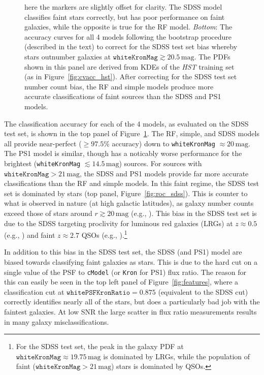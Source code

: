\documentclass[twocolumn]{aastex62}
\begin{document}
\begin{figure}[htb]
{  here the markers are slightly offset for clarity. The SDSS model
  classifies faint stars correctly, but has poor performance on faint
  galaxies, while the opposite is true for the RF model.
  \textit{Bottom}: The accuracy curves for all 4 models following the
  bootstrap procedure (described in the text) to correct for the SDSS test
  set bias whereby stars outnumber galaxies at $\mathtt{whiteKronMag}
  \gtrsim 20.5\,\mathrm{mag}$. The PDFs shown in this panel are derived from
  KDEs of the \textit{HST} training set (as in Figure~\ref{fig:cvacc_hst}).
  After correcting for the SDSS test set number count bias, the RF and
  simple models produce more accurate classifications of faint sources than
  the SDSS and PS1 models.}
  \label{fig:acc_sdss}
\end{figure}

The classification accuracy for each of the 4 models, as evaluated on the
SDSS test set, is shown in the top panel of Figure~\ref{fig:acc_sdss}. The
RF, simple, and SDSS models all provide near-perfect ($\ge 97.5$\% accuracy)
down to \texttt{whiteKronMag} $\approx 20\,\mathrm{mag}$. The PS1 model is
similar, though has a noticably worse performance for the brightest
(\texttt{whiteKronMag} $\lesssim 14.5\,\mathrm{mag}$) sources. For sources
with $\mathtt{whiteKronMag} > 21\,\mathrm{mag}$, the SDSS and PS1 models
provide far more accurate classifications than the RF and simple models. In
this faint regime, the SDSS test set is dominated by stars (top panel,
Figure~\ref{fig:roc_sdss}). This is counter to what is observed in nature
(at high galactic latitudes), as galaxy number counts exceed those of stars
around $r \gtrsim 20\,\mathrm{mag}$ (e.g., \citealt{Yasuda01,Shanks15}).
This bias in the SDSS test set is due to the SDSS targeting proclivity for
luminous red galaxies (LRGs) at $z \approx 0.5$ (e.g.,
\citealt{Eisenstein01}) and faint $z \approx 2.7$ QSOs (e.g.,
\citealt{Ross12}).\footnote{For the SDSS test set, the peak in the galaxy
PDF at $\mathtt{whiteKronMag} \approx 19.75\,\mathrm{mag}$ is dominated by
LRGs, while the population of faint ($\mathtt{whiteKronMag} >
21\,\mathrm{mag}$) stars is dominated by QSOs.}

In addition to this bias in the SDSS test set, the SDSS (and PS1) model are
biased towards classifying faint galaxies as stars. This is due to the hard
cut on a single value of the PSF to \texttt{cModel} (or \texttt{Kron} for
PS1) flux ratio. The reason for this can easily be seen in the top left
panel of Figure~\ref{fig:features}, where a classification cut at
$\mathtt{whitePSFKronRatio} = 0.875$ (equivalent to the SDSS cut) correctly
identifies nearly all of the stars, but does a particularly bad job with the
faintest galaxies. At low SNR the large scatter in flux ratio measurements
results in many galaxy misclassifications.
\end{document}
